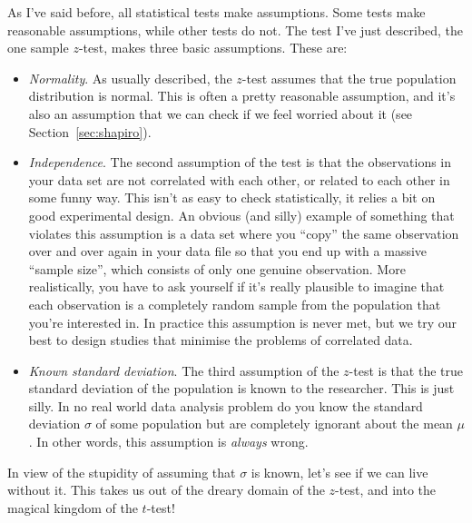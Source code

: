 As I've said before, all statistical tests make assumptions. Some tests make reasonable assumptions, while other tests do not. The test I've just described, the one sample $z$-test, makes three basic assumptions. These are:
\begin{itemize}
\item {\it Normality}. As usually described, the $z$-test assumes that the true population distribution is normal. This is often a pretty reasonable assumption, and it's also an assumption that we can check if we feel worried about it (see Section~\ref{sec:shapiro}). 
\item {\it Independence}. The second assumption of the test is that the observations in your data set are not correlated with each other, or related to each other in some funny way. This isn't as easy to check statistically, it relies a bit on good experimental design. An obvious (and silly) example of something that violates this assumption is a data set where you “copy” the same observation over and over again in your data file so that you end up with a massive “sample size”, which consists of only one genuine observation. More realistically, you have to ask yourself if it's really plausible to imagine that each observation is a completely random sample from the population that you're interested in. In practice this assumption is never met, but we try our best to design studies that minimise the problems of correlated data. 
\item {\it Known standard deviation}. The third assumption of the $z$-test is that the true standard deviation of the population is known to the researcher. This is just silly. In no real world data analysis problem do you know the standard deviation $\sigma$ of some population but are completely ignorant about the mean $\mu$. In other words, this assumption is {\it always} wrong. 
\end{itemize}
In view of the stupidity of assuming that $\sigma$ is known, let's see if we can live without it. This takes us out of the dreary domain of the $z$-test, and into the magical kingdom of the $t$-test!


